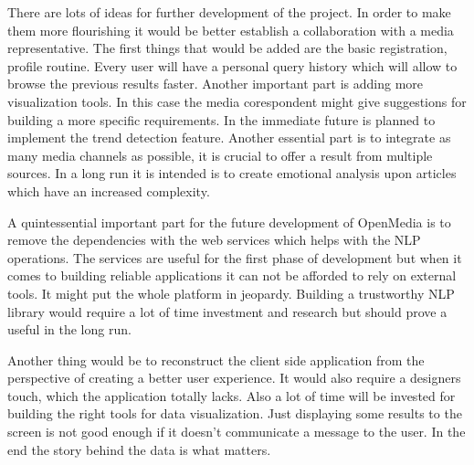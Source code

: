 There are lots of ideas for further development of the project. In order to make them more flourishing it would be better establish a collaboration with a media representative. The first things that would be added are the basic registration, profile routine. Every user will have a personal query history which will allow to browse the previous results faster. Another important part is adding more visualization tools. In this case the media corespondent might give suggestions for building a more specific requirements. In the immediate future is planned to implement the trend detection feature. Another essential part is to integrate as many media channels as possible, it is crucial to offer a result from multiple sources. In a long run it is intended is to create emotional analysis upon articles which have an increased complexity.

A quintessential important part for the future development of OpenMedia is to remove the dependencies with the web services which helps with the NLP operations. The services are useful for the first phase of development but when it comes to building reliable applications it can not be afforded to rely on external tools. It might put the whole platform in jeopardy. Building a trustworthy NLP library would require a lot of time investment and research but should prove a useful in the long run.

Another thing would be to reconstruct the client side application from the perspective of creating a better user experience. It would also require a designers touch, which the application totally lacks. Also a lot of time will be invested for building the right tools for data visualization. Just displaying some results to the screen is not good enough if it doesn't communicate a message to the user. In the end the story behind the data is what matters.
\clearpage